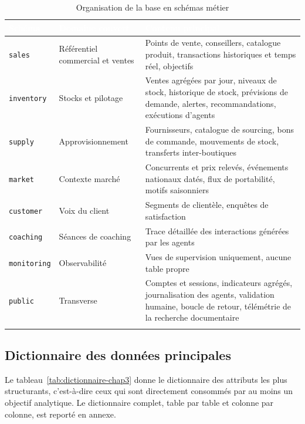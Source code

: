 \begin{longtable}{|P{2.2cm}|P{5.2cm}|P{6.6cm}|}
\hline
{}
\textcolor{white}{\textbf{Schéma}} &
\textcolor{white}{\textbf{Domaine couvert}} &
\textcolor{white}{\textbf{Contenu principal}} \\
\hline
\endhead
\hline
\endfoot
\hline
\endlastfoot
\texttt{sales} & Référentiel commercial et ventes & Points de vente, conseillers, catalogue produit, transactions historiques et temps réel, objectifs \\
\hline
\texttt{inventory} & Stocks et pilotage & Ventes agrégées par jour, niveaux de stock, historique de stock, prévisions de demande, alertes, recommandations, exécutions d'agents \\
\hline
\texttt{supply} & Approvisionnement & Fournisseurs, catalogue de sourcing, bons de commande, mouvements de stock, transferts inter-boutiques \\
\hline
\texttt{market} & Contexte marché & Concurrents et prix relevés, événements nationaux datés, flux de portabilité, motifs saisonniers \\
\hline
\texttt{customer} & Voix du client & Segments de clientèle, enquêtes de satisfaction \\
\hline
\texttt{coaching} & Séances de coaching & Trace détaillée des interactions générées par les agents \\
\hline
\texttt{monitoring} & Observabilité & Vues de supervision uniquement, aucune table propre \\
\hline
\texttt{public} & Transverse & Comptes et sessions, indicateurs agrégés, journalisation des agents, validation humaine, boucle de retour, télémétrie de la recherche documentaire \\
\hline
\caption{Organisation de la base en schémas métier}
\label{tab:schemas-chap3}
\end{longtable}
\endgroup

\subsection{Dictionnaire des données principales}

Le tableau~\ref{tab:dictionnaire-chap3} donne le dictionnaire des attributs les plus structurants, c'est-à-dire ceux qui sont directement consommés par au moins un objectif analytique. Le dictionnaire complet, table par table et colonne par colonne, est reporté en annexe.

\begingroup
\setlength{\tabcolsep}{3pt}
\renewcommand{\arraystretch}{1.15}
\small

